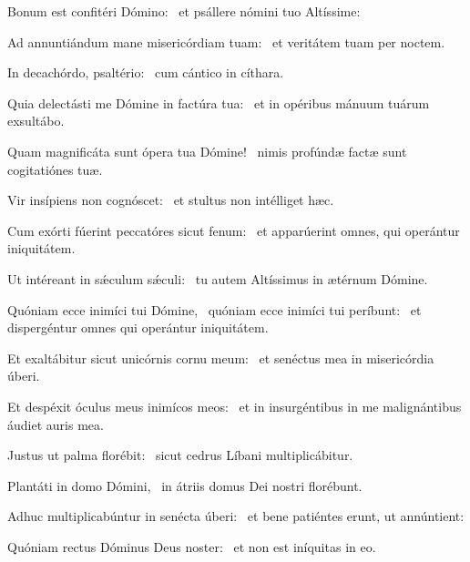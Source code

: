 \item Bonum est confitéri Dómino:~\psstar{} et psállere nómini tuo Altíssime:

\item Ad annuntiándum mane misericórdiam tuam:~\psstar{} et veritátem tuam per noctem.

\item In decachórdo, psaltério:~\psstar{} cum cántico in cíthara.

\item Quia delectásti me Dómine in factúra tua:~\psstar{} et in opéribus mánuum tuárum exsultábo.

\item Quam magnificáta sunt ópera tua Dómine!~\psstar{} nimis profúndæ factæ sunt cogitatiónes tuæ.

\item Vir insípiens non cognóscet:~\psstar{} et stultus non intélliget hæc.

\item Cum exórti fúerint peccatóres sicut fenum:~\psstar{} et apparúerint omnes, qui operántur iniquitátem.

\item Ut intéreant in sǽculum sǽculi:~\psstar{} tu autem Altíssimus in ætérnum Dómine.

\item Quóniam ecce inimíci tui Dómine,~\pscross{} quóniam ecce inimíci tui períbunt:~\psstar{} et dispergéntur omnes qui operántur iniquitátem.

\item Et exaltábitur sicut unicórnis cornu meum:~\psstar{} et senéctus mea in misericórdia úberi.

\item Et despéxit óculus meus inimícos meos:~\psstar{} et in insurgéntibus in me malignántibus áudiet auris mea.

\item Justus ut palma florébit:~\psstar{} sicut cedrus Líbani multiplicábitur.

\item Plantáti in domo Dómini,~\psstar{} in átriis domus Dei nostri florébunt.

\item Adhuc multiplicabúntur in senécta úberi:~\psstar{} et bene patiéntes erunt, ut annúntient:

\item Quóniam rectus Dóminus Deus noster:~\psstar{} et non est iníquitas in eo.